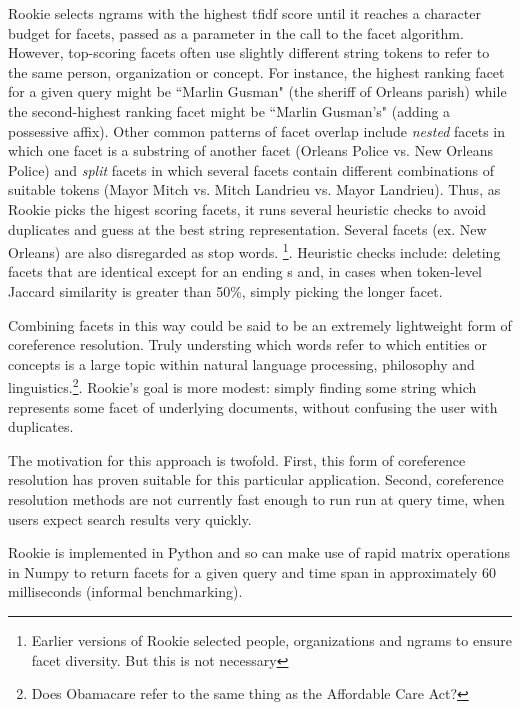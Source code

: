 Rookie selects ngrams with the highest tfidf score until it reaches a character budget for facets, passed as a parameter in the call to the facet algorithm. However, top-scoring facets often use slightly different string tokens to refer to the same person, organization or concept. For instance, the highest ranking facet for a given query might be ``Marlin Gusman" (the sheriff of Orleans parish) while the second-highest ranking facet might be ``Marlin Gusman's" (adding a possessive affix). Other common patterns of facet overlap include \textit{nested} facets in which one facet is a substring of another facet (Orleans Police vs. New Orleans Police) and \textit{split} facets in which several facets contain different combinations of suitable tokens (Mayor Mitch vs. Mitch Landrieu vs. Mayor Landrieu). Thus, as Rookie picks the higest scoring facets, it runs several heuristic checks to avoid duplicates and guess at the best string representation. Several facets (ex. New Orleans) are also disregarded as stop words. \footnote{Earlier versions of Rookie selected people, organizations and ngrams to ensure facet diversity. But this is not necessary}. Heuristic checks include: deleting facets that are identical except for an ending s and, in cases when token-level Jaccard similarity is greater than 50\%, simply picking the longer facet.

Combining facets in this way could be said to be an extremely lightweight form of coreference resolution. Truly understing which words refer to which entities or concepts is a large topic within natural language processing, philosophy and linguistics.\footnote{Does Obamacare refer to the same thing as the Affordable Care Act?}. Rookie's goal is more modest: simply finding some string which represents some facet of underlying documents, without confusing the user with duplicates. 

The motivation for this approach is twofold. First, this form of coreference resolution has proven suitable for this particular application. Second, coreference resolution methods are not currently fast enough to run run at query time, when users expect search results very quickly.

Rookie is implemented in Python and so can make use of rapid matrix operations in Numpy to return facets for a given query and time span in approximately 60 milliseconds (informal benchmarking). 